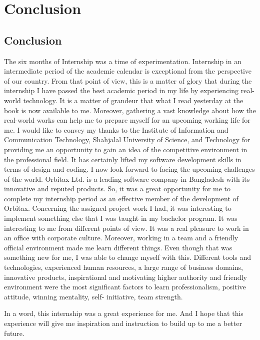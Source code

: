 \chapter{Conclusion}
\begin{flushleft}
\label{ch:discussion}

\section{Conclusion}
The six months of Internship was a time of experimentation. Internship in an intermediate period of the academic calendar is exceptional from the perspective of our country. From that point of view, this is a matter of glory that during the internship I have passed the best academic period in my life by experiencing real-world technology. It is a matter of grandeur that what I read yesterday at the book is now available to me. Moreover, gathering a vast knowledge about how the real-world works can help me to prepare myself for an upcoming working life for me.
I would like to convey my thanks to the Institute of Information and Communication Technology, Shahjalal University of Science, and Technology for providing me an opportunity to gain an idea of the competitive environment in the professional field. It has certainly lifted my software development skills in terms of design and coding. I now look forward to facing the upcoming challenges of the world.
Orbitax Ltd. is a leading software company in Bangladesh with its innovative and reputed products. So, it was a great opportunity for me to complete my internship period as an effective member of the development of Orbitax. Concerning the assigned project work I had, it was interesting to implement something else that I was taught in my bachelor program. It was interesting to me from different points of view. It was a real pleasure to work in an office with corporate culture. Moreover, working in a team and a friendly official environment made me learn different things. Even though that was something new for me, I was able to change myself with this. Different tools and technologies, experienced human resources, a large range of business domains, innovative products, inspirational and motivating higher authority and friendly environment were the most significant factors to learn professionalism, positive attitude, winning mentality, self- initiative, team strength.

In a word, this internship was a great experience for me. And I hope that this experience will give me inspiration and instruction to build up to me a better future.

\end{flushleft}